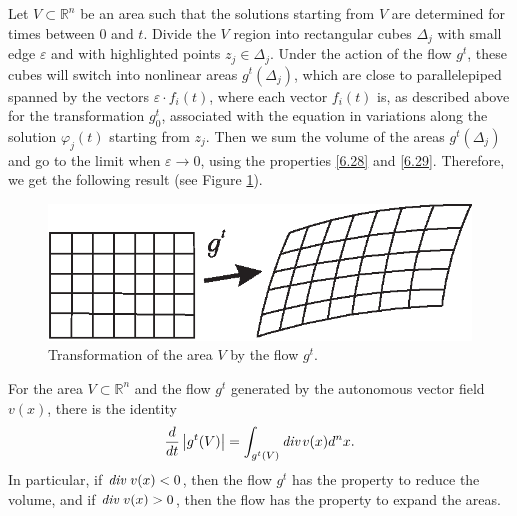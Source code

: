 Let $V\subset \mathbb{R}^{n}$ be an area such that the solutions starting from $V$ are determined for times between $0$ and $t$. Divide the $V$ region into rectangular cubes $\Delta _{j}$ with small edge $\varepsilon $ and with highlighted points $z_{j}\in \Delta _{j}$. Under the action of the flow $g^{t}$, these cubes will switch into nonlinear areas $g^{t}(\Delta _{j})$, which are close to parallelepiped spanned by the vectors $\varepsilon \cdot f_{i}(t)$, where each vector $f_{i} (t)$ is, as described above for the transformation $g_{0}^{t}$, associated with the equation in variations along the solution $\varphi _{j}(t)$ starting from $z_{j}$. Then we sum the volume of the areas $g^{t}(\Delta _{j})$ and go to the limit when $\varepsilon
\to 0$, using the properties \eqref{6.28} and \eqref{6.29}. Therefore, we get the following result (see Figure \ref{fig:A2}).

\begin{figure}[!ht]
	\centering
	\includegraphics [scale=1.2]{jtrA2}
	\caption{Transformation of the area $V$ by the flow $g^t$.}
	\label{fig:A2}
\end{figure}

\begin{theorem}
	For the area $V\subset \mathbb{R}^{n}$ and the flow $g^t$ generated by the autonomous vector field $v (x)$, there is the identity
	$$
	\frac{d}{dt}\left\vert g^{t}(V)\right\vert =\int_{g^{t}(V)}\emph{div\,}%
	v(x)d^{n}x.
	$$
	In particular, if $\emph{\textrm{div}}\ v(x) < 0$, then the flow $g^t$ has the property to reduce the volume, and if $\emph{\textrm{div}}\ v(x) > 0$, then the flow has the property to expand the areas.
\end{theorem}

